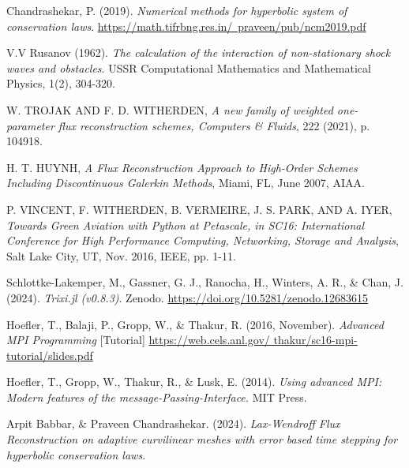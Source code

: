 \begin{thebibliography}{100}
Chandrashekar, P. (2019). {\em Numerical methods for hyperbolic system of conservation laws}. \href{https://math.tifrbng.res.in/~praveen/pub/ncm2019.pdf}{https://math.tifrbng.res.in/~praveen/pub/ncm2019.pdf}

V.V Rusanov (1962). {\em The calculation of the interaction of non-stationary shock waves and obstacles}. USSR Computational Mathematics and Mathematical Physics, 1(2), 304-320.

W. TROJAK AND F. D. WITHERDEN, {\em A new family of weighted one-parameter flux reconstruction schemes, Computers \& Fluids}, 222 (2021), p. 104918.

H. T. HUYNH, {\em A Flux Reconstruction Approach to High-Order Schemes Including Discontinuous Galerkin Methods}, Miami, FL, June 2007, AIAA.

P. VINCENT, F. WITHERDEN, B. VERMEIRE, J. S. PARK, AND A. IYER, {\em Towards Green Aviation with Python at Petascale, in SC16: International Conference for High Performance Computing, Networking, Storage and Analysis}, Salt Lake City, UT, Nov. 2016, IEEE, pp. 1-11.

Schlottke-Lakemper, M., Gassner, G. J., Ranocha, H., Winters, A. R., \& Chan, J. (2024). {\em Trixi.jl (v0.8.3)}. Zenodo. \href{https://doi.org/10.5281/zenodo.12683615}{https://doi.org/10.5281/zenodo.12683615}

Hoefler, T., Balaji, P., Gropp, W., \& Thakur, R. (2016, November). \textit{Advanced MPI Programming} [Tutorial] \href{https://web.cels.anl.gov/ thakur/sc16-mpi-tutorial/slides.pdf}{https://web.cels.anl.gov/ thakur/sc16-mpi-tutorial/slides.pdf}

Hoefler, T., Gropp, W., Thakur, R., \& Lusk, E. (2014). \textit{Using advanced MPI: Modern features of the message-Passing-Interface.} MIT Press.

Arpit Babbar, \& Praveen Chandrashekar. (2024). \textit{Lax-Wendroff Flux Reconstruction on adaptive curvilinear meshes with error based time stepping for hyperbolic conservation laws.}

\end{thebibliography}